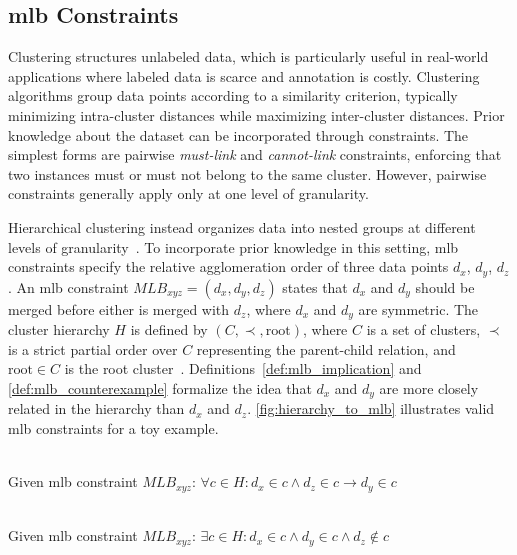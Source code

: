 
\subsection{\acl{mlb} Constraints}
\label{sec:foundations_mlb}

Clustering structures unlabeled data, which is particularly useful in real-world applications where labeled data is scarce and annotation is costly. 
Clustering algorithms group data points according to a similarity criterion, typically minimizing intra-cluster distances while maximizing inter-cluster distances.
Prior knowledge about the dataset can be incorporated through constraints. 
The simplest forms are pairwise \textit{must-link} and \textit{cannot-link} constraints, enforcing that two instances must or must not belong to the same cluster. 
However, pairwise constraints generally apply only at one level of granularity.

Hierarchical clustering instead organizes data into nested groups at different levels of granularity~\cite{bade_hierarchical_2014}. 
To incorporate prior knowledge in this setting, \ac{mlb} constraints specify the relative agglomeration order of three data points $d_x$, $d_y$, $d_z$. 
An \ac{mlb} constraint $MLB_{x y z} = (d_x, d_y, d_z)$ states that $d_x$ and $d_y$ should be merged before either is merged with $d_z$, where $d_x$ and $d_y$ are symmetric. 
The cluster hierarchy $H$ is defined by $(C, \prec, \text{root})$, where $C$ is a set of clusters, $\prec$ is a strict partial order over $C$ representing the parent-child relation, and $\text{root} \in C$ is the root cluster~\cite{bade_hierarchical_2014}. 
Definitions~\eqref{def:mlb_implication} and \eqref{def:mlb_counterexample} formalize the idea that $d_x$ and $d_y$ are more closely related in the hierarchy than $d_x$ and $d_z$. 
\autoref{fig:hierarchy_to_mlb} illustrates valid \ac{mlb} constraints for a toy example.

\begin{definition}
    \label{def:mlb_implication}\\
    Given \ac{mlb} constraint $MLB_{x y z}$:
    $\forall c \in H: d_x \in c \wedge d_z \in c \rightarrow d_y \in c$
\end{definition}
\begin{definition}
    \label{def:mlb_counterexample}\\
    Given \ac{mlb} constraint $MLB_{x y z}$:
    $\exists c \in H: d_x \in c \wedge d_y \in c \wedge d_z \notin c$
\end{definition}

